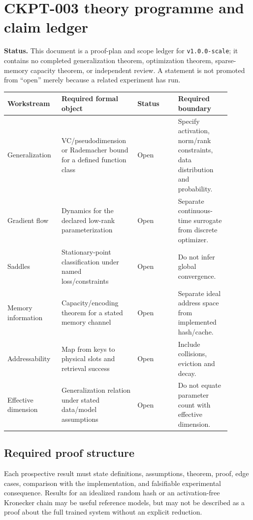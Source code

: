 \section{CKPT-003 theory programme and claim ledger}
\label{sec:ckpt003-theory-scope}

\textbf{Status.} This document is a proof-plan and scope ledger for
\texttt{v1.0.0-scale}; it contains no completed generalization theorem,
optimization theorem, sparse-memory capacity theorem, or independent review.
A statement is not promoted from ``open'' merely because a related experiment
has run.

\begin{center}
\begin{tabular}{p{0.22\linewidth}p{0.29\linewidth}p{0.17\linewidth}p{0.22\linewidth}}
\toprule
Workstream & Required formal object & Status & Required boundary \\
\midrule
Generalization & VC/pseudodimension or Rademacher bound for a defined function class & Open & Specify activation, norm/rank constraints, data distribution and probability. \\
Gradient flow & Dynamics for the declared low-rank parameterization & Open & Separate continuous-time surrogate from discrete optimizer. \\
Saddles & Stationary-point classification under named loss/constraints & Open & Do not infer global convergence. \\
Memory information & Capacity/encoding theorem for a stated memory channel & Open & Separate ideal address space from implemented hash/cache. \\
Addressability & Map from keys to physical slots and retrieval success & Open & Include collisions, eviction and decay. \\
Effective dimension & Generalization relation under stated data/model assumptions & Open & Do not equate parameter count with effective dimension. \\
\bottomrule
\end{tabular}
\end{center}

\subsection{Required proof structure}
Each prospective result must state definitions, assumptions, theorem, proof,
edge cases, comparison with the implementation, and falsifiable experimental
consequence. Results for an idealized random hash or an activation-free
Kronecker chain may be useful reference models, but may not be described as a
proof about the full trained system without an explicit reduction.

